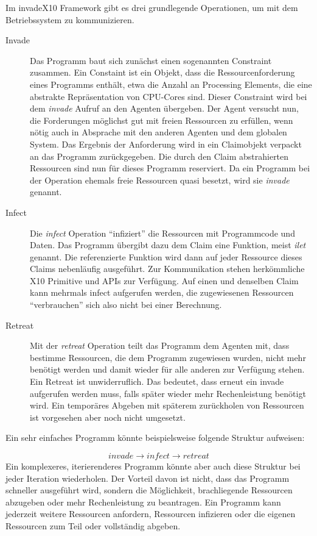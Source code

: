 Im invadeX10 Framework gibt es drei grundlegende Operationen, um mit dem Betriebssystem zu kommunizieren.
\begin{description}
	\item[Invade] Das Programm baut sich zunächst einen sogenannten Constraint zusammen. Ein Constaint ist ein Objekt, dass die Ressourcenforderung eines Programms enthält, etwa die Anzahl an Processing Elements, die eine abstrakte Repräsentation von CPU-Cores sind. Dieser Constraint wird bei dem \textit{invade} Aufruf an den Agenten übergeben. Der Agent versucht nun, die Forderungen möglichst gut mit freien Ressourcen zu erfüllen, wenn nötig auch in Absprache mit den anderen Agenten und dem globalen System. Das Ergebnis der Anforderung wird in ein Claimobjekt verpackt an das Programm zurückgegeben. Die durch den Claim abstrahierten Ressourcen sind nun für dieses Programm reserviert. Da ein Programm bei der Operation ehemals freie Ressourcen quasi besetzt, wird sie \textit{invade} genannt.
	\item[Infect] Die \textit{infect} Operation \enquote{infiziert} die Ressourcen mit Programmcode und Daten. Das Programm übergibt dazu dem Claim eine Funktion, meist \textit{ilet} genannt. Die referenzierte Funktion wird dann auf jeder Ressource dieses Claims nebenläufig ausgeführt. Zur Kommunikation stehen herkömmliche X10 Primitive und APIs zur Verfügung. Auf einen und denselben Claim kann mehrmals infect aufgerufen werden, die zugewiesenen Ressourcen \enquote{verbrauchen} sich also nicht bei einer Berechnung.
	\item[Retreat] Mit der \textit{retreat} Operation teilt das Programm dem Agenten mit, dass bestimme Ressourcen, die dem Programm zugewiesen wurden, nicht mehr benötigt werden und damit wieder für alle anderen zur Verfügung stehen. Ein Retreat ist unwiderruflich. Das bedeutet, dass erneut ein invade aufgerufen werden muss, falls später wieder mehr Rechenleistung benötigt wird. Ein temporäres Abgeben mit späterem zurückholen von Ressourcen ist vorgesehen aber noch nicht umgesetzt.
\end{description}

Ein sehr einfaches Programm könnte beispielsweise folgende Struktur aufweisen:

$$\mathit{invade}\rightarrow\mathit{infect}\rightarrow\mathit{retreat}$$
Ein komplexeres, iterierenderes Programm könnte aber auch diese Struktur bei jeder Iteration wiederholen. Der Vorteil davon ist nicht, dass das Programm schneller ausgeführt wird, sondern die Möglichkeit, brachliegende Ressourcen abzugeben oder mehr Rechenleistung zu beantragen. Ein Programm kann jederzeit weitere Ressourcen anfordern, Ressourcen infizieren oder die eigenen Ressourcen zum Teil oder vollständig abgeben. 
